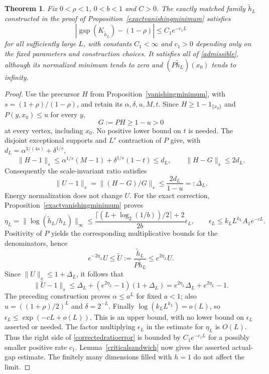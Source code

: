 \documentclass[11pt]{article}
\newtheorem{theorem}{Theorem}[section]
\begin{document}
\begin{theorem}\label{vanishingminimumgap}
Fix $0<\rho<1$, $0<b<1$ and $C>0$. The exactly matched family
$\widetilde h_L$ constructed in the proof of
Proposition~\ref{exactvanishingminimum} satisfies
\[
 |\operatorname{gap}(K_{\widetilde h_L})-(1-\rho)|
 \leq C_1e^{-c_1L}
\]
for all sufficiently large $L$, with constants $C_1<\infty$ and
$c_1>0$ depending only on the fixed parameters and construction choices.
It satisfies all of \eqref{admissible}, although its normalized minimum
tends to zero and $(P\widetilde h_L)(x_0)$ tends to infinity.
\end{theorem}
\begin{proof}
Use the precursor $H$ from Proposition~\ref{vanishingminimum}, with
$s=(1+\rho)/(1-\rho)$, and retain its $\alpha,\delta,u,M,t$.
Since $H\geq1-1_{\{x_0\}}$ and $P(y,x_0)\leq u$ for every $y$,
\[
 G:=PH\geq1-u>0
\]
at every vertex, including $x_0$. No positive lower bound on $t$ is
needed. The disjoint exceptional supports and $L^s$ contraction of $P$
give, with $d_L=\alpha^{3/(4s)}+\delta^{1/s}$,
\[
 \|H-1\|_s\leq\alpha^{1/s}(M-1)+\delta^{1/s}(1-t)\leq d_L,
 \qquad \|H-G\|_s\leq2d_L.
\]
Consequently the scale-invariant ratio satisfies
\[
 \|U-1\|_s=\|(H-G)/G\|_s
 \leq\frac{2d_L}{1-u}=:\Delta_L.
\]
Energy normalization does not change $U$. For the exact correction,
Proposition~\ref{exactvanishingminimum} proves
\[
 \eta_L=\|\log(\widetilde h_L/h_L)\|_\infty
 \leq\frac{\lceil(L+\log_2(1/b))/2\rceil+2}{2b}\epsilon_L,
 \qquad \epsilon_L\leq k_LL^{k_L}A_1e^{-cL}.
\]
Positivity of $P$ yields the corresponding multiplicative bounds for
the denominators, hence
\[
 e^{-2\eta_L}U\leq\widetilde U
 :=\frac{\widetilde h_L}{P\widetilde h_L}\leq e^{2\eta_L}U.
\]
Since $\|U\|_s\leq1+\Delta_L$, it follows that
\begin{equation}\label{correctedratioerror}
 \|\widetilde U-1\|_s
 \leq\Delta_L+(e^{2\eta_L}-1)(1+\Delta_L)
 =e^{2\eta_L}\Delta_L+e^{2\eta_L}-1.
\end{equation}
The preceding construction proves $\alpha\leq a^L$ for fixed $a<1$;
also $u=((1+\rho)/2)^L$ and $\delta=2^{-L}$.
Finally $\log(k_LL^{k_L})=o(L)$, so
$\epsilon_L\leq\exp(-cL+o(L))$. This is an upper bound, with no
lower bound on $\epsilon_L$ asserted or needed. The factor multiplying
$\epsilon_L$ in the estimate for $\eta_L$ is $O(L)$.
Thus the right side of \eqref{correctedratioerror} is bounded by
$C_1e^{-c_1L}$ for a possibly smaller positive rate $c_1$.
Lemma~\ref{criticalsandwich} now gives the asserted actual-gap estimate.
The finitely many dimensions filled with $h=1$ do not affect the limit.
\end{proof}
\end{document}

